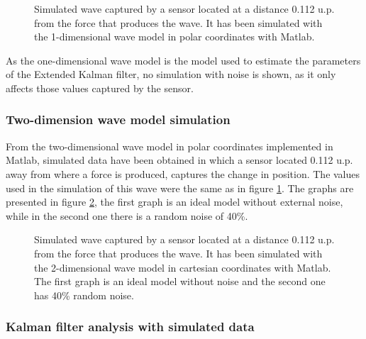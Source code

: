 \documentclass[12pt, a4paper]{article} %
\begin{document}
\setlength{\parskip}{4mm}

\begin{figure}[htbp]
    \centering
    
    \caption{Simulated wave captured by a sensor located at a distance 0.112 u.p. from the force that produces the wave. It has been simulated with the 1-dimensional wave model in polar coordinates with Matlab.}
    \label{fig:modelo1}
\end{figure}

As the one-dimensional wave model is the model used to estimate the parameters of the Extended Kalman filter, no simulation with noise is shown, as it only affects those values captured by the sensor.

\newpage
\subsubsection{Two-dimension wave model simulation}

\setlength{\parskip}{0mm}

From the two-dimensional wave model in polar coordinates implemented in Matlab, simulated data have been obtained in which a sensor located 0.112 u.p. away from where a force is produced, captures the change in position. The values used in the simulation of this wave were the same as in figure \ref{fig:modelo1}. The graphs are presented in figure \ref{fig:modelo2}, the first graph is an ideal model without external noise, while in the second one there is a random noise of 40\%.

\setlength{\parskip}{4mm}

\begin{figure}[h!]
    \centering
    
    \caption{Simulated wave captured by a sensor located at a distance 0.112 u.p. from the force that produces the wave. It has been simulated with the 2-dimensional wave model in cartesian coordinates with Matlab. The first graph is an ideal model without noise and the second one has 40\% random noise.}
    \label{fig:modelo2}
\end{figure}

\newpage
\subsubsection{Kalman filter analysis with simulated data}
\end{document}
